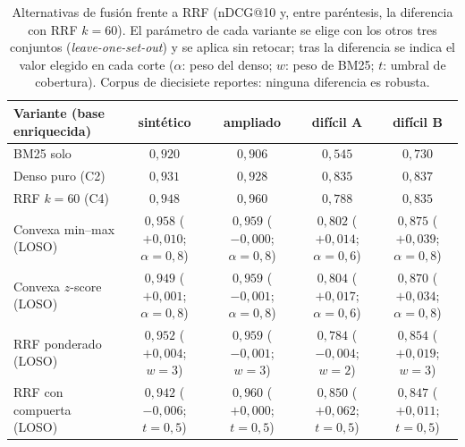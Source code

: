 \documentclass[11pt,letterpaper]{article}
\numberwithin{equation}{section}
\begin{document}
\begin{table}[htbp]
\centering
\footnotesize
\setlength{\tabcolsep}{5pt}
\renewcommand{\arraystretch}{1.25}
\caption{Alternativas de fusión frente a RRF (nDCG@10 y, entre paréntesis, la diferencia con RRF $k=60$). El parámetro de cada variante se elige con los otros tres conjuntos (\textit{leave-one-set-out}) y se aplica sin retocar; tras la diferencia se indica el valor elegido en cada corte ($\alpha$: peso del denso; $w$: peso de BM25; $t$: umbral de cobertura). Corpus de diecisiete reportes: ninguna diferencia es robusta.}
\label{tab:fusion}
\begin{tabularx}{\textwidth}{@{}l C C C C@{}}
\toprule
\textbf{Variante (base enriquecida)} & \textbf{sintético} & \textbf{ampliado} & \textbf{difícil A} & \textbf{difícil B} \\
\midrule
BM25 solo & $0{,}920$ & $0{,}906$ & $0{,}545$ & $0{,}730$ \\
Denso puro (C2) & $0{,}931$ & $0{,}928$ & $0{,}835$ & $0{,}837$ \\
RRF $k=60$ (C4) & $0{,}948$ & $0{,}960$ & $0{,}788$ & $0{,}835$ \\
Convexa min--max (LOSO) & $0{,}958$ ($+0{,}010$; $\alpha=0{,}8$) & $0{,}959$ ($-0{,}000$; $\alpha=0{,}8$) & $0{,}802$ ($+0{,}014$; $\alpha=0{,}6$) & $0{,}875$ ($+0{,}039$; $\alpha=0{,}8$) \\
Convexa $z$-score (LOSO) & $0{,}949$ ($+0{,}001$; $\alpha=0{,}8$) & $0{,}959$ ($-0{,}001$; $\alpha=0{,}8$) & $0{,}804$ ($+0{,}017$; $\alpha=0{,}6$) & $0{,}870$ ($+0{,}034$; $\alpha=0{,}8$) \\
RRF ponderado (LOSO) & $0{,}952$ ($+0{,}004$; $w=3$) & $0{,}959$ ($-0{,}001$; $w=3$) & $0{,}784$ ($-0{,}004$; $w=2$) & $0{,}854$ ($+0{,}019$; $w=3$) \\
RRF con compuerta (LOSO) & $0{,}942$ ($-0{,}006$; $t=0{,}5$) & $0{,}960$ ($+0{,}000$; $t=0{,}5$) & $0{,}850$ ($+0{,}062$; $t=0{,}5$) & $0{,}847$ ($+0{,}011$; $t=0{,}5$) \\
\bottomrule
\end{tabularx}
\end{table}
\end{document}
